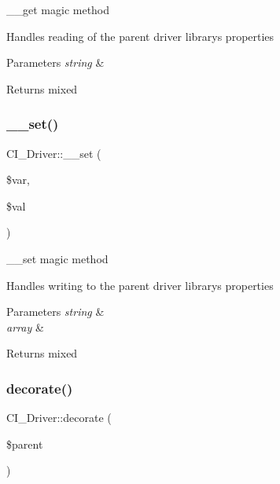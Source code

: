 \+\_\+\+\_\+get magic method

Handles reading of the parent driver library\textquotesingle{}s properties


\begin{DoxyParams}{Parameters}
{\em string} & \\
\hline
\end{DoxyParams}
\begin{DoxyReturn}{Returns}
mixed 
\end{DoxyReturn}
\mbox{\label{class_c_i___driver_a1f7d30797f4b11006ac015952e259910}} 
\subsubsection{\texorpdfstring{\+\_\+\+\_\+set()}{\_\_set()}}
{\footnotesize\ttfamily C\+I\+\_\+\+Driver\+::\+\_\+\+\_\+set (\begin{DoxyParamCaption}\item[{}]{\$var,  }\item[{}]{\$val }\end{DoxyParamCaption})}

\+\_\+\+\_\+set magic method

Handles writing to the parent driver library\textquotesingle{}s properties


\begin{DoxyParams}{Parameters}
{\em string} & \\
\hline
{\em array} & \\
\hline
\end{DoxyParams}
\begin{DoxyReturn}{Returns}
mixed 
\end{DoxyReturn}
\mbox{\label{class_c_i___driver_a70860cdaec57d11aab77c18dd3212c94}} 
\subsubsection{\texorpdfstring{decorate()}{decorate()}}
{\footnotesize\ttfamily C\+I\+\_\+\+Driver\+::decorate (\begin{DoxyParamCaption}\item[{}]{\$parent }\end{DoxyParamCaption})}

